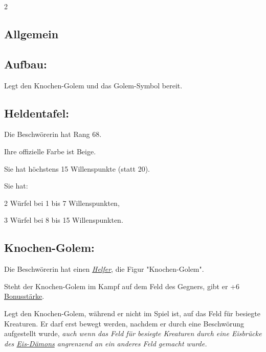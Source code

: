 \documentclass[10pt, a4paper, oneside]{book}
\newcommand{\fan}[1]{\textit{#1}}
\begin{document}
\begin{multicols*}{2}\raggedcolumns


\begin{nobgcolor}


\section{Allgemein}


\subsection{Aufbau:} 

Legt den Knochen-Golem und das Golem-Symbol bereit.





\subsection{Heldentafel:}

Die Beschwörerin hat Rang 68.

Ihre offizielle Farbe ist Beige.

Sie hat höchstens 15 Willenspunkte (statt 20).

Sie hat:

\bullet{} 2 Würfel bei 1 bis 7 Willenspunkten,

\bullet{} 3 Würfel bei 8 bis 15 Willenspunkten.





\subsection{Knochen-Golem:}



Die Beschwörerin hat einen \hyperref[helfer]{\fan{Helfer}}, die Figur "Knochen-Golem".

Steht der Knochen-Golem im Kampf auf dem Feld des Gegners, gibt er +6 \hyperref[bonusstaerke]{Bonusstärke}.
\supercite{dh-knochen-golem}


Legt den Knochen-Golem, während er nicht im Spiel ist, auf das Feld für besiegte Kreaturen.
\supercite{dh-knochen-golem}
Er darf erst bewegt werden, nachdem er durch eine Beschwörung aufgestellt wurde, \fan{auch wenn das Feld für besiegte Kreaturen durch eine Eisbrücke des \hyperref[eis-daemon]{Eis-Dämons} angrenzend an ein anderes Feld gemacht wurde.}








\end{nobgcolor}
\end{multicols*}
\end{document}
